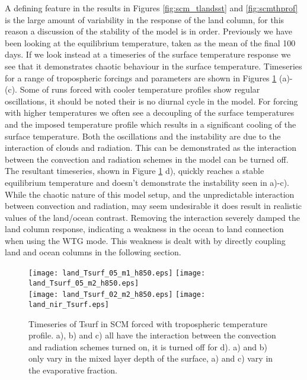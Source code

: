 A defining feature in the results in Figures \ref{fig:scm_tlandsst} and 
\ref{fig:scmthprof} is the large amount of variability in the response of the 
land column, for this reason a discussion of the stability of the model is in 
order. Previously we have been looking at the equilibrium temperature, taken as 
the mean of the final 100 days. If we look instead at a timeseries of the 
surface temperature response we see that it demonstrates chaotic behaviour in 
the surface temperature. Timeseries for a range of tropospheric forcings and 
parameters are shown in Figures \ref{fig:scmts} (a)-(c). Some of runs forced 
with cooler temperature profiles show regular oscillations, it should be noted 
their is no diurnal cycle in the model.  For forcing with higher temperatures we 
often see a decoupling of the surface temperatures and the imposed temperature 
profile which results in a significant cooling of the surface temperature.  Both 
the oscillations and the instability are due to the interaction of clouds and 
radiation. This can be demonstrated as the interaction between the convection 
and radiation schemes in the model can be turned off. The resultant timeseries, 
shown in Figure \ref{fig:scmts} d), quickly reaches a stable equilibrium 
temperature and doesn't demonstrate the instability seen in a)-c). While the 
chaotic nature of this model setup, and the unpredictable interaction between 
convection and radiation, may seem undesirable it does result in realistic 
values of the land/ocean contrast. Removing the interaction severely damped the 
land column response, indicating a weakness in the ocean to land connection when 
using the WTG mode. This weakness is dealt with by directly coupling land and 
ocean columns in the following section.

\begin{figure}[ht]
\texttt{[image: land\_Tsurf\_05\_m1\_h850.eps]}
\texttt{[image: land\_Tsurf\_05\_m2\_h850.eps]}\\
\texttt{[image: land\_Tsurf\_02\_m2\_h850.eps]}
\texttt{[image: land\_nir\_Tsurf.eps]}\\
\caption{Timeseries of Tsurf in SCM forced with tropospheric temperature 
profile. a), b) and c) all have the interaction between the convection and 
radiation schemes turned on, it is turned off for d). a) and b) only vary in the 
mixed layer depth of the surface, a) and c) vary in the evaporative fraction.}
\label{fig:scmts}
\end{figure}

